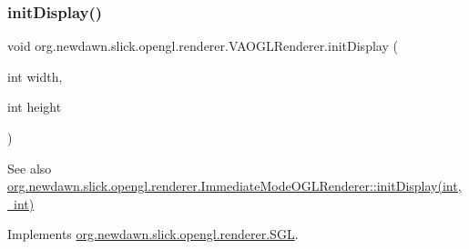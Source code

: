 \mbox{\label{classorg_1_1newdawn_1_1slick_1_1opengl_1_1renderer_1_1_v_a_o_g_l_renderer_a3fbd9ed92506387ab043ab5ddd8e6327}} 
\subsubsection{\texorpdfstring{init\+Display()}{initDisplay()}}
{\footnotesize\ttfamily void org.\+newdawn.\+slick.\+opengl.\+renderer.\+V\+A\+O\+G\+L\+Renderer.\+init\+Display (\begin{DoxyParamCaption}\item[{int}]{width,  }\item[{int}]{height }\end{DoxyParamCaption})\hspace{0.3cm}{\ttfamily [inline]}}

\begin{DoxySeeAlso}{See also}
\mbox{\hyperlink{classorg_1_1newdawn_1_1slick_1_1opengl_1_1renderer_1_1_immediate_mode_o_g_l_renderer_a05e00bbbf5384585fa1d7c34c8932c6f}{org.\+newdawn.\+slick.\+opengl.\+renderer.\+Immediate\+Mode\+O\+G\+L\+Renderer\+::init\+Display(int, int)}} 
\end{DoxySeeAlso}


Implements \mbox{\hyperlink{interfaceorg_1_1newdawn_1_1slick_1_1opengl_1_1renderer_1_1_s_g_l_a7c5e2c0345c667230bab6bc67865fd24}{org.\+newdawn.\+slick.\+opengl.\+renderer.\+S\+GL}}.


